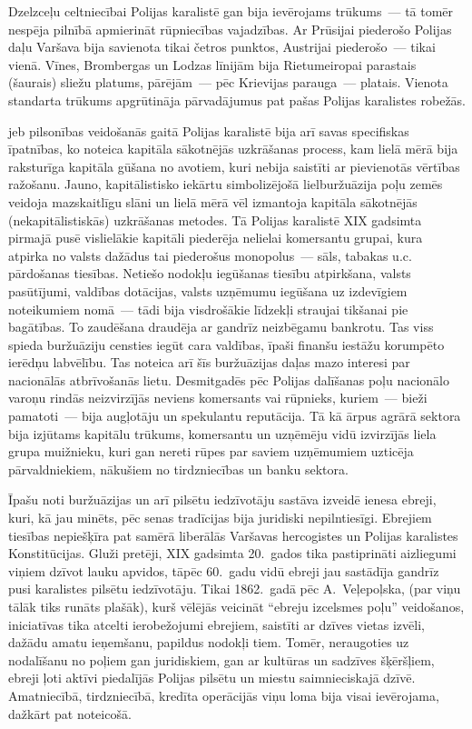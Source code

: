 \documentclass[twoside,a5paper,12pt,fleqn,openany]{extbook}
\begin{document}
Dzelzceļu celtniecībai Polijas karalistē gan bija ievērojams trūkums~--- tā tomēr nespēja pilnībā apmierināt rūpniecības vajadzības. Ar Prūsijai piederošo Polijas daļu Varšava bija savienota tikai četros punktos, Austrijai piederošo~--- tikai vienā. Vīnes, Brombergas un Lodzas līnijām bija Rietumeiropai parastais (šaurais) sliežu platums, pārējām~--- pēc Krievijas parauga~--- platais. Vienota standarta trūkums apgrūtināja pārvadājumus pat pašas Polijas karalistes robežās.

 jeb pilsonības veidošanās gaitā Polijas karalistē bija arī savas specifiskas īpatnības, ko noteica kapitāla sākotnējās uzkrāšanas process, kam lielā mērā bija raksturīga kapitāla gūšana no avotiem, kuri nebija saistīti ar pievienotās vērtības ražošanu. Jauno, kapitālistisko iekārtu simbolizējošā lielburžuāzija poļu zemēs veidoja mazskaitlīgu slāni un lielā mērā vēl izmantoja kapitāla sākotnējās (nekapitālistiskās) uzkrāšanas metodes. Tā Polijas karalistē XIX gadsimta pirmajā pusē vislielākie kapitāli piederēja nelielai komersantu grupai, kura atpirka no valsts dažādus tai piederošus monopolus~--- sāls, tabakas u.c. pārdošanas tiesības. Netiešo nodokļu iegūšanas tiesību atpirkšana, valsts pasūtījumi, valdības dotācijas, valsts uzņēmumu iegūšana uz izdevīgiem noteikumiem nomā~--- tādi bija visdrošākie līdzekļi straujai tikšanai pie bagātības. To zaudēšana draudēja ar gandrīz neizbēgamu bankrotu. Tas viss spieda buržuāziju censties iegūt cara valdības, īpaši finanšu iestāžu korumpēto ierēdņu labvēlību. Tas noteica arī šīs buržuāzijas daļas mazo interesi par nacionālās atbrīvošanās lietu. Desmitgadēs pēc Polijas dalīšanas poļu nacionālo varoņu rindās neizvirzījās neviens komersants vai rūpnieks, kuriem~--- bieži pamatoti~--- bija augļotāju un spekulantu reputācija. Tā kā ārpus agrārā sektora bija izjūtams kapitālu trūkums, komersantu un uzņēmēju vidū izvirzījās liela grupa muižnieku, kuri gan nereti rūpes par saviem uzņēmumiem uzticēja pārvaldniekiem, nākušiem no tirdzniecības un banku sektora.

Īpašu noti buržuāzijas un arī pilsētu iedzīvotāju sastāva izveidē ienesa ebreji, kuri, kā jau minēts, pēc senas tradīcijas bija juridiski nepilntiesīgi. Ebrejiem tiesības nepiešķīra pat samērā liberālās Varšavas hercogistes un Polijas karalistes Konstitūcijas. Gluži pretēji, XIX gadsimta 20.~gados tika pastiprināti aizliegumi viņiem dzīvot lauku apvidos, tāpēc 60.~gadu vidū ebreji jau sastādīja gandrīz pusi karalistes pilsētu iedzīvotāju. Tikai 1862.~gadā pēc A.~Veļepoļska, (par viņu tālāk tiks runāts plašāk), kurš vēlējās veicināt ``ebreju izcelsmes poļu'' veidošanos, iniciatīvas tika atcelti ierobežojumi ebrejiem, saistīti ar dzīves vietas izvēli, dažādu amatu ieņemšanu, papildus nodokļi tiem. Tomēr, neraugoties uz nodalīšanu no poļiem gan juridiskiem, gan ar kultūras un sadzīves šķēršļiem, ebreji ļoti aktīvi piedalījās Polijas pilsētu un miestu saimnieciskajā dzīvē. Amatniecībā, tirdzniecībā, kredīta operācijās viņu loma bija visai ievērojama, dažkārt pat noteicošā.
\end{document}
